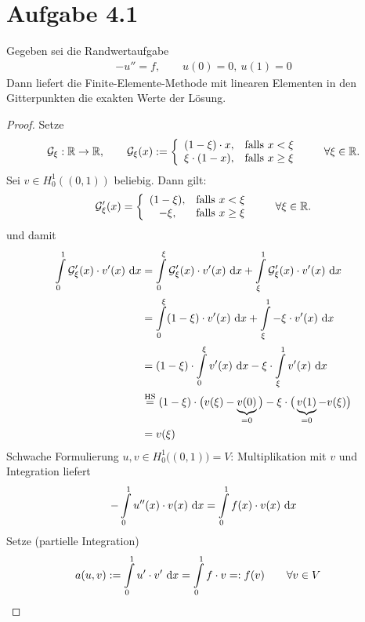 \documentclass[12pt,a4paper]{article}
\author{Willi Sontopski}
\newcommand{\G}{\mathcal{G}}
\begin{document}

\section*{Aufgabe 4.1}
Gegeben sei die Randwertaufgabe
\begin{align*}
-u''= f,\qquad u(0)=0,~u(1)=0
\end{align*}
Dann liefert die Finite-Elemente-Methode mit linearen Elementen in den Gitterpunkten die exakten Werte der Lösung.

\begin{proof}
Setze
\begin{align*}
\G_\xi:\R\to\R,\qquad
\G_\xi(x):=\left\lbrace\begin{array}{cl}
(1-\xi)\cdot x, &\falls x<\xi\\
\xi\cdot(1-x), &\falls x\geq\xi
\end{array}\right.\qquad\forall\xi\in\R.
\end{align*}
Sei $v\in H_0^1((0,1))$ beliebig. Dann gilt:
\begin{align*}
\G_\xi'(x)=\left\lbrace\begin{array}{cl}
(1-\xi), &\falls x<\xi\\
-\xi, &\falls x\geq\xi
\end{array}\right.\qquad\forall\xi\in\R.
\end{align*}
und damit
\begin{align*}
\int\limits_0^1\G_\xi'(x)\cdot v'(x)\d x
&=\int\limits_0^\xi\G_\xi'(x)\cdot v'(x)\d x+\int\limits_\xi^1\G_\xi'(x)\cdot v'(x)\d x\\
&=\int\limits_0^\xi (1-\xi)\cdot v'(x)\d x+\int\limits_\xi^1-\xi\cdot v'(x)\d x\\
&=(1-\xi)\cdot\int\limits_0^\xi v'(x)\d x-\xi\cdot\int\limits_\xi^1 v'(x)\d x\\
&\stackeq{\text{HS}}
(1-\xi)\cdot\big(v(\xi)-\underbrace{v(0)}_{=0}\big)-\xi\cdot\big(\underbrace{v(1)}_{=0}-v(\xi)\big)\\
&=v(\xi)
\end{align*}
Schwache Formulierung $u,v\in H_0^1\big((0,1)\big)=V$: Multiplikation mit $v$ und Integration liefert
\begin{align*}
-\int\limits_0^1 u''(x)\cdot v(x)\text{ d} x=\int\limits_0^1 f(x)\cdot v(x)\text{ d} x
\end{align*}
Setze (partielle Integration)
\begin{align*}
a(u,v)&:=\int\limits_0^1 u'\cdot v'\text{ d} x=\int\limits_0^1 f\cdot v=:f(v)\qquad\forall v\in V
\end{align*}

\end{proof}
\end{document}
